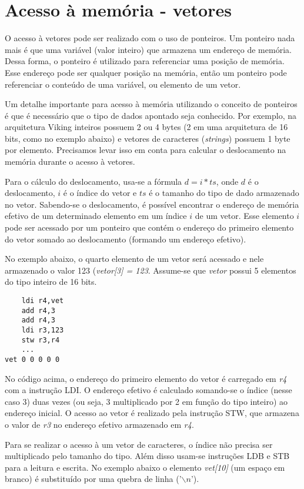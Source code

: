 \documentclass{extreport}
\begin{document}
\section{Acesso à memória - vetores}

O acesso à vetores pode ser realizado com o uso de ponteiros. Um ponteiro nada mais é que uma variável (valor inteiro) que armazena um endereço de memória. Dessa forma, o ponteiro é utilizado para referenciar uma posição de memória. Esse endereço pode ser qualquer posição na memória, então um ponteiro pode referenciar o conteúdo de uma variável, ou elemento de um vetor.

Um detalhe importante para acesso à memória utilizando o conceito de ponteiros é que é necessário que o tipo de dados apontado seja conhecido. Por exemplo, na arquitetura Viking inteiros possuem 2 ou 4 bytes (2 em uma arquitetura de 16 bits, como no exemplo abaixo) e vetores de caracteres (\textit{strings}) possuem 1 byte por elemento. Precisamos levar isso em conta para calcular o deslocamento na memória durante o acesso à vetores.

Para o cálculo do deslocamento, usa-se a fórmula $d = i * ts$, onde $d$ é o deslocamento, $i$ é o índice do vetor e $ts$ é o tamanho do tipo de dado armazenado no vetor. Sabendo-se o deslocamento, é possível encontrar o endereço de memória efetivo de um determinado elemento em um índice $i$ de um vetor. Esse elemento $i$ pode ser acessado por um ponteiro que contém o endereço do primeiro elemento do vetor somado ao deslocamento (formando um endereço efetivo).

No exemplo abaixo, o quarto elemento de um vetor será acessado e nele armazenado o valor 123 (\textit{vetor[3] = 123}. Assume-se que \textit{vetor} possui 5 elementos do tipo inteiro de 16 bits.

\begin{verbatim}
    ldi r4,vet
    add r4,3
    add r4,3
    ldi r3,123
    stw r3,r4
    ...
vet 0 0 0 0 0
\end{verbatim}

No código acima, o endereço do primeiro elemento do vetor é carregado em \textit{r4} com a instrução LDI. O endereço efetivo é calculado somando-se o índice (nesse caso 3) duas vezes (ou seja, 3 multiplicado por 2 em função do tipo inteiro) ao endereço inicial. O acesso ao vetor é realizado pela instrução STW, que armazena o valor de \textit{r3} no endereço efetivo armazenado em \textit{r4}.

Para se realizar o acesso à um vetor de caracteres, o índice não precisa ser multiplicado pelo tamanho do tipo. Além disso usam-se instruções LDB e STB para a leitura e escrita. No exemplo abaixo o elemento \textit{vet[10]} (um espaço em branco) é substituído por uma quebra de linha ('$\backslash n$').
\end{document}
